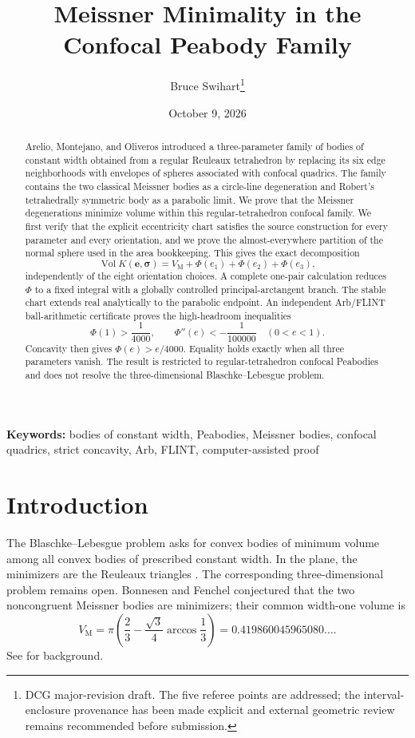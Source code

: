 \documentclass[11pt]{article}
\title{Meissner Minimality in the Confocal Peabody Family}
\author{Bruce Swihart\thanks{DCG major-revision draft.  The five referee points are addressed; the interval-enclosure provenance has been made explicit and external geometric review remains recommended before submission.}}
\date{October 9, 2026}
\numberwithin{equation}{section}
\theoremstyle{remark}
\newcommand{\Vol}{\operatorname{Vol}}
\newcommand{\VM}{V_{\mathrm M}}
\begin{document}
\maketitle

\begin{abstract}
Arelio, Montejano, and Oliveros introduced a three-parameter family of bodies of constant width obtained from a regular Reuleaux tetrahedron by replacing its six edge neighborhoods with envelopes of spheres associated with confocal quadrics.  The family contains the two classical Meissner bodies as a circle-line degeneration and Robert's tetrahedrally symmetric body as a parabolic limit.  We prove that the Meissner degenerations minimize volume within this regular-tetrahedron confocal family.  We first verify that the explicit eccentricity chart satisfies the source construction for every parameter and every orientation, and we prove the almost-everywhere partition of the normal sphere used in the area bookkeeping.  This gives the exact decomposition
\[
  \Vol K(\mathbf e,\boldsymbol\sigma)
  =\VM+\Phi(e_1)+\Phi(e_2)+\Phi(e_3),
\]
independently of the eight orientation choices.  A complete one-pair calculation reduces \(\Phi\) to a fixed integral with a globally controlled principal-arctangent branch.  The stable chart extends real analytically to the parabolic endpoint.  An independent Arb/FLINT ball-arithmetic certificate proves the high-headroom inequalities
\[
  \Phi(1)>\frac1{4000},
  \qquad
  \Phi''(e)<-\frac1{100000}\quad(0<e<1).
\]
Concavity then gives \(\Phi(e)>e/4000\).  Equality holds exactly when all three parameters vanish.  The result is restricted to regular-tetrahedron confocal Peabodies and does not resolve the three-dimensional Blaschke--Lebesgue problem.
\end{abstract}

\noindent\textbf{Keywords:} bodies of constant width, Peabodies, Meissner bodies, confocal quadrics, strict concavity, Arb, FLINT, computer-assisted proof

\section{Introduction}

The Blaschke--Lebesgue problem asks for convex bodies of minimum volume among all convex bodies of prescribed constant width.  In the plane, the minimizers are the Reuleaux triangles \cite{Blaschke1915,Lebesgue1914}.  The corresponding three-dimensional problem remains open.  Bonnesen and Fenchel conjectured that the two noncongruent Meissner bodies are minimizers; their common width-one volume is
\begin{equation}
  \VM
  =\pi\left(\frac23-\frac{\sqrt3}{4}\arccos\frac13\right)
  =0.419860045965080\ldots .
  \label{eq:meissner-volume}
\end{equation}
See \cite{KawohlWeber2011,MartiniMontejanoOliveros2019,Nishioka2026} for background.
\end{document}
